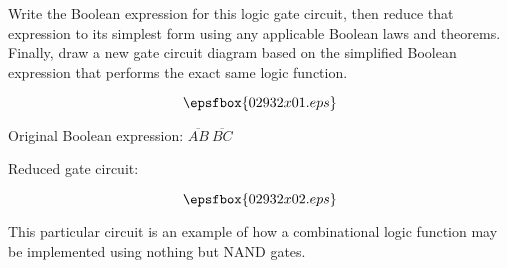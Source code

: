 

Write the Boolean expression for this logic gate circuit, then reduce that expression to its simplest form using any applicable Boolean laws and theorems.  Finally, draw a new gate circuit diagram based on the simplified Boolean expression that performs the exact same logic function.

$$\epsfbox{02932x01.eps}$$







Original Boolean expression: $\overline{AB} \> \overline{BC}$

\vskip 10pt

Reduced gate circuit:

$$\epsfbox{02932x02.eps}$$







This particular circuit is an example of how a combinational logic function may be implemented using nothing but NAND gates.





